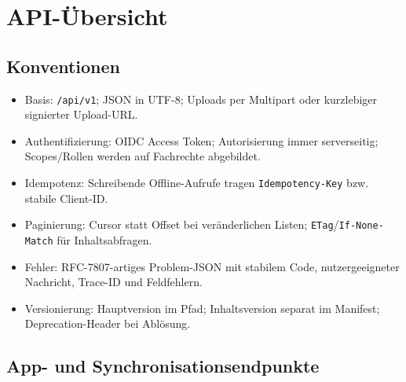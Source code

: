 \documentclass[10pt,a4paper,oneside]{article}
\newcommand{\Code}[1]{\texttt{\small #1}}
\begin{document}
\section{API-Übersicht}\label{sec:api}

\subsection{Konventionen}

\begin{itemize}
  \item Basis: \Code{/api/v1}; JSON in UTF-8; Uploads per Multipart oder kurzlebiger signierter Upload-URL.
  \item Authentifizierung: OIDC Access Token; Autorisierung immer serverseitig; Scopes/Rollen werden auf Fachrechte abgebildet.
  \item Idempotenz: Schreibende Offline-Aufrufe tragen \Code{Idempotency-Key} bzw. stabile Client-ID.
  \item Paginierung: Cursor statt Offset bei veränderlichen Listen; \Code{ETag}/\Code{If-None-Match} für Inhaltsabfragen.
  \item Fehler: RFC-7807-artiges Problem-JSON mit stabilem Code, nutzergeeigneter Nachricht, Trace-ID und Feldfehlern.
  \item Versionierung: Hauptversion im Pfad; Inhaltsversion separat im Manifest; Deprecation-Header bei Ablösung.
\end{itemize}

\subsection{App- und Synchronisationsendpunkte}
\end{document}
